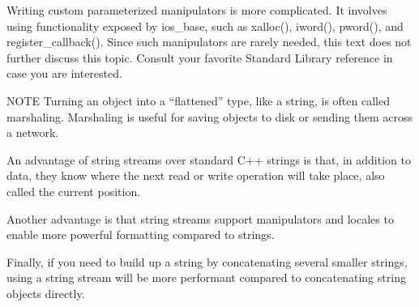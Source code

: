 Writing custom parameterized manipulators is more complicated. It involves using functionality exposed by ios\_base, such as xalloc(), iword(), pword(), and register\_callback(). Since such manipulators are rarely needed, this text does not further discuss this topic. Consult your favorite Standard Library reference in case you are interested.

\begin{myNotic}{NOTE}
Turning an object into a “flattened” type, like a string, is often called marshaling. Marshaling is useful for saving objects to disk or sending them across a network.
\end{myNotic}

An advantage of string streams over standard C++ strings is that, in addition to data, they know where the next read or write operation will take place, also called the current position.

Another advantage is that string streams support manipulators and locales to enable more powerful formatting compared to strings.

Finally, if you need to build up a string by concatenating several smaller strings, using a string stream will be more performant compared to concatenating string objects directly.

